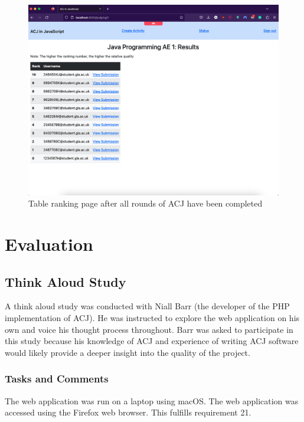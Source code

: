 \documentclass{l4proj}
\begin{document}
\begin{figure}[h]
\begin{center}
    \includegraphics[width=0.85\linewidth]{images/results.png}  
    \caption{Table ranking page after all rounds of ACJ have been completed}
\end{center}
\end{figure}

\chapter{Evaluation} 

\section{Think Aloud Study}

A think aloud study was conducted with Niall Barr (the developer of the PHP implementation of ACJ). He was instructed to explore the web application on his own and voice his thought process throughout. Barr was asked to participate in this study because his knowledge of ACJ and experience of writing ACJ software would likely provide a deeper insight into the quality of the project.

\subsection{Tasks and Comments}

The web application was run on a laptop using macOS. The web application was accessed using the Firefox web browser. This fulfills requirement 21.
\end{document}
